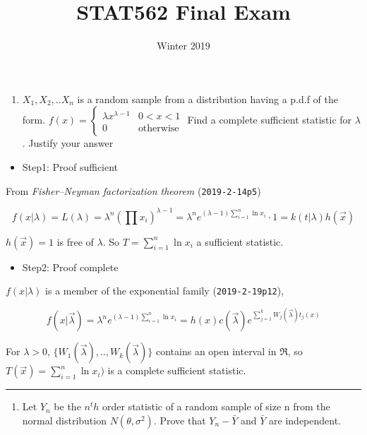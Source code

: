 \documentclass[12pt,]{article}
\title{STAT562 Final Exam}
\author{}
\date{Winter 2019}
\providecommand{\tightlist}{%
  \setlength{\itemsep}{0pt}\setlength{\parskip}{0pt}}
\begin{document}
\maketitle

\begin{enumerate}
\def\labelenumi{\arabic{enumi}.}
\tightlist
\item
  \textcolor[rgb]{0.5,0.5,0.5}{$X_1,X_2,..X_n$ is a random sample from a distribution having a p.d.f of the form.
  $f(x)=\begin{cases}\lambda x^{\lambda-1}&0<x<1\\0&\text{otherwise}\end{cases}$
  Find a complete sufficient statistic for $\lambda$. Justify your answer}
\end{enumerate}

\begin{itemize}
\tightlist
\item
  Step1: Proof sufficient
\end{itemize}

From \emph{Fisher--Neyman factorization theorem} (\texttt{2019-2-14p5})

\[f(x|\lambda)=L(\lambda)=\lambda^n(\prod x_i)^{\lambda-1}=\lambda^ne^{(\lambda-1)\sum^n_{i=1} \ln x_i}\cdot1=k(t|\lambda)h(\vec x)\]

\(h(\vec x)=1\) is free of \(\lambda\). So \(T=\sum^n_{i=1} \ln x_i\) a
sufficient statistic.

\begin{itemize}
\tightlist
\item
  Step2: Proof complete
\end{itemize}

\(f(x|\lambda)\) is a member of the exponential family
(\texttt{2019-2-19p12}),

\[f(x|\vec\lambda)=\lambda^ne^{(\lambda-1)\sum^n_{i=1} \ln x_i}=h(x)c(\vec \lambda)e^{\sum^k_{j=1}W_j(\vec \lambda)t_j(x)}\]

For \(\lambda>0\), \(\{W_1(\vec \lambda),..,W_k(\vec \lambda)\}\)
contains an open interval in \(\Re\), so
\(T(\vec x)=\sum^n_{i=1} \ln x_i)\) is a complete sufficient statistic.

\begin{center}\rule{0.5\linewidth}{\linethickness}\end{center}

\begin{enumerate}
\def\labelenumi{\arabic{enumi}.}
\setcounter{enumi}{1}
\tightlist
\item
  \textcolor[rgb]{0.5,0.5,0.5}{Let $Y_n$ be the $n^th$ order statistic of a random sample of size n from the normal distribution $N(\theta,\sigma^2)$. Prove that $Y_n-\bar Y$ and $\bar Y$ are independent.}
\end{enumerate}
\end{document}
